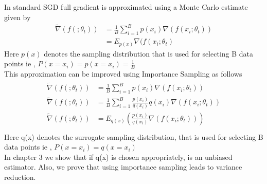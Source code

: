 \documentclass[a4paper,twoside]{iiththesis}
\theoremstyle{definition}
\theoremstyle{definition}
\theoremstyle{remark}
\begin{document}
In standard SGD full gradient is approximated using a Monte Carlo estimate given by
\begin{align}
\tilde{\nabla}(f(; \theta_t)) & = \frac{1}{B}\sum_{i=1}^B p(x_i) \nabla(f(x_i; \theta_t))\\
& = E_{p(x)}\nabla(f(x_i; \theta_t)
\end{align}
Here $p(x)$ denotes the sampling distribution that is used for selecting B data points ie , $P(x=x_i) = p(x=x_i) = \frac{1}{B}$ \\
This approximation can be improved using Importance Sampling as follows
\begin{align}\label{imp-sample}
\begin{split}
	\tilde{\nabla}(f(; \theta_t)) & = \frac{1}{B}\sum_{i=1}^B p(x_i) \nabla(f(x_i; \theta_t))\\
    \tilde{\nabla}(f(; \theta_t)) & = \frac{1}{B}\sum_{i=1}^B \frac{p(x_i)}{q(x_i)} q(x_i) \nabla(f(x_i; \theta_t))\\
    \tilde{\nabla}(f(; \theta_t)) & = E_{q(x)}\left( \frac{p(x_i)}{q(x_i)}  \nabla(f(x_i; \theta_t))\right)\\
 \end{split}
\end{align}
Here q(x) denotes the surrogate sampling distribution, that is used for selecting B data points ie , $P(x=x_i) = q(x=x_i)$ \\
In chapter 3 we show that if q(x) is chosen appropriately, is an unbiased estimator. Also, we prove that using importance sampling leads to variance reduction. 
% 
% 
\end{document}

